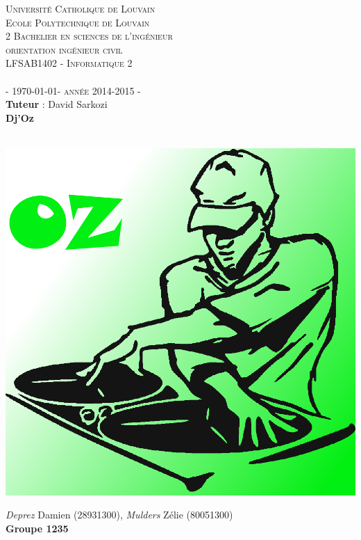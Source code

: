 \begin{titlepage}

\begin{center}
\textsc{\LARGE  Université Catholique de Louvain}\\[0.5cm]

\textsc{\large Ecole Polytechnique de Louvain\\ 2 Bachelier en sciences de l'ingénieur\\ orientation ingénieur civil\\ \vspace{0.15cm}
LFSAB1402 - Informatique 2}\\[2cm]

\textsc{\Large   \\  \vspace{0.8cm}- \today - année 2014-2015 -}\\[0.5cm]
{\large\textbf{Tuteur} : David Sarkozi }
\vspace{0.5cm}
\HRule \\[0.4cm]

{ \huge \bfseries Dj'Oz \\[0.4cm]}

\HRule \\[1.5cm]

\includegraphics[width=(\textwidth /2)]{DJOZ.png}

\vspace{1.0cm}

\emph{Deprez} Damien (28931300), \emph{Mulders} Zélie (80051300)\\

\textbf{Groupe 1235}

 
\end{center}
\end{titlepage}